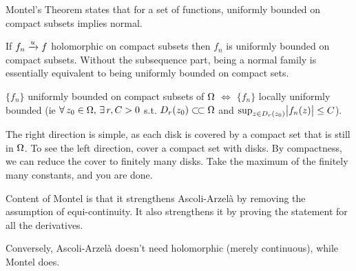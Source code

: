 \begin{remark}
Montel's Theorem states that for a set of functions, uniformly bounded on compact subsets implies normal.

If $f_n \xrightarrow[]{u} f$ holomorphic on compact subsets then $f_n$ is uniformly bounded on compact subsets. Without the subsequence part, being a normal family is essentially equivalent to being uniformly bounded on compact sets.
\end{remark}


\begin{remark}
$\{ f_n \}$ uniformly bounded on compact subsets of $\Omega$ $\iff$ $\{ f_n \}$ locally uniformly bounded (ie $\forall \, z_0 \in \Omega, \, \exists \, r,C > 0 $ s.t. $ D_r(z_0) \ssubset \om$ and $\sup_{z \in D_r(z_0)} \abs{f_n(z)} \leq C$).

The right direction is simple, as each disk is covered by a compact set that is still in $\Omega$. To see the left direction, cover a compact set with disks. By compactness, we can reduce the cover to finitely many disks. Take the maximum of the finitely many constants, and you are done.
\end{remark}

\begin{remark}
Content of Montel is that it strengthens Ascoli-Arzelà by removing the assumption of equi-continuity. It also strengthens it by proving the statement for all the derivatives.

Conversely, Ascoli-Arzelà doesn't need holomorphic (merely continuous), while Montel does.
\end{remark}

